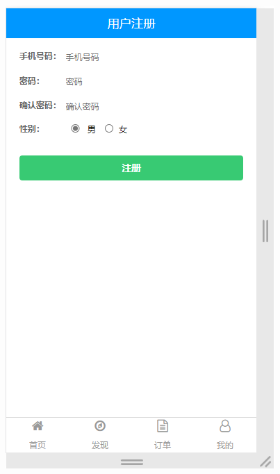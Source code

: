 \begin{figure}[H]
{\begin{minipage}[t]{0.22\linewidth}
            \includegraphics[scale=0.3]{figures/2.2.7.png}\\

\end{minipage}}
\end{figure}
